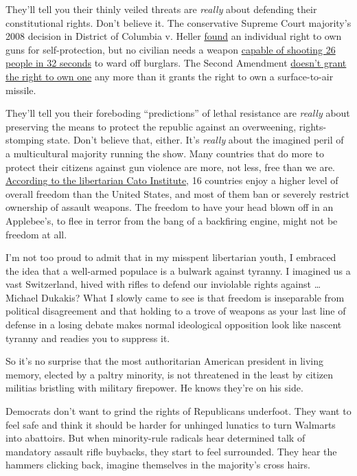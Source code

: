 They'll tell you their thinly veiled threats are \emph{really} about
defending their constitutional rights. Don't believe it. The
conservative Supreme Court majority's 2008 decision in District of
Columbia v. Heller \href{https://www.oyez.org/cases/2007/07-290}{found}
an individual right to own guns for self-protection, but no civilian
needs a weapon
\href{https://www.nytimes.com/2019/08/13/us/dayton-shooter-video-timeline.html}{capable
of shooting 26 people in 32 seconds} to ward off burglars. The Second
Amendment
\href{https://beta.washingtonpost.com/news/morning-mix/wp/2018/02/22/does-the-second-amendment-really-protect-assault-weapons-four-courts-have-said-no/}{doesn't
grant the right to own one} any more than it grants the right to own a
surface-to-air missile.

They'll tell you their foreboding ``predictions'' of lethal resistance
are \emph{really} about preserving the means to protect the republic
against an overweening, rights-stomping state. Don't believe that,
either. It's \emph{really} about the imagined peril of a multicultural
majority running the show. Many countries that do more to protect their
citizens against gun violence are more, not less, free than we are.
\href{https://object.cato.org/sites/cato.org/files/human-freedom-index-files/human-freedom-index-2018-revised.pdf}{According
to the libertarian Cato Institute}, 16 countries enjoy a higher level of
overall freedom than the United States, and most of them ban or severely
restrict ownership of assault weapons. The freedom to have your head
blown off in an Applebee's, to flee in terror from the bang of a
backfiring engine, might not be freedom at all.

I'm not too proud to admit that in my misspent libertarian youth, I
embraced the idea that a well-armed populace is a bulwark against
tyranny. I imagined us a vast Switzerland, hived with rifles to defend
our inviolable rights against \ldots{} Michael Dukakis? What I slowly
came to see is that freedom is inseparable from political disagreement
and that holding to a trove of weapons as your last line of defense in a
losing debate makes normal ideological opposition look like nascent
tyranny and readies you to suppress it.

So it's no surprise that the most authoritarian American president in
living memory, elected by a paltry minority, is not threatened in the
least by citizen militias bristling with military firepower. He knows
they're on his side.

Democrats don't want to grind the rights of Republicans underfoot. They
want to feel safe and think it should be harder for unhinged lunatics to
turn Walmarts into abattoirs. But when minority-rule radicals hear
determined talk of mandatory assault rifle buybacks, they start to feel
surrounded. They hear the hammers clicking back, imagine themselves in
the majority's cross hairs.

